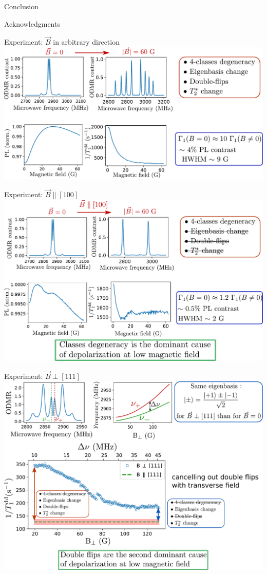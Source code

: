 \documentclass{beamer}
\begin{document}
\begin{frame}{Conclusion}

\end{frame}

\begin{frame}{Acknowledgments}

\end{frame}

\begin{frame}{Experiment: $\vec B$ in arbitrary direction}
\centering
\includegraphics[width=\textwidth,height=0.85\textheight,keepaspectratio]{Slide_T1_PL_1x1x1x1}
\end{frame}

\begin{frame}{Experiment: $\vec B \parallel [100]$}
\centering
\includegraphics[width=\textwidth,height=0.85\textheight,keepaspectratio]{Slide_T1_PL_100}
\end{frame}

\begin{frame}{Experiment: $\vec B \perp [111]$}
\centering
\includegraphics[width=\textwidth,height=0.85\textheight,keepaspectratio]{slide_champs_transverse}
\end{frame}
\end{document}
